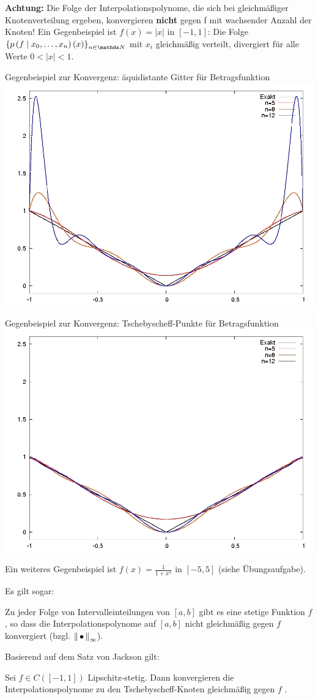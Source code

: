 \textbf{Achtung:} Die Folge der Interpolationspolynome,
die sich bei gleichmäßiger Knotenverteilung ergeben,
konvergieren \textbf{nicht} gegen f mit wachsender Anzahl der Knoten!
Ein Gegenbeispiel ist $f(x)=|x|$ in $[-1,1]$:
Die Folge $\left\{\ipol{p}{f}{x_0,\dotsc,x_n}(x)\right\}_{n\in\N}$
mit $x_i$ gleichmäßig verteilt,
divergiert für alle Werte $0<|x|<1$.

\begin{image}{Gegenbeispiel zur Konvergenz: äquidistante Gitter für Betragsfunktion}
  \includegraphics[width=0.5\linewidth]{images/afg49aequi.jpg}
\end{image}
\label{6.1.20im1}
\begin{image}{Gegenbeispiel zur Konvergenz: Tschebyscheff-Punkte für Betragsfunktion}
  \includegraphics[width=0.5\linewidth]{images/afg49tscheby.jpeg}
\end{image}
\label{6.1.20im2}

Ein weiteres Gegenbeispiel ist $f(x)=\frac{1}{1+x^2}$ in $[-5,5]$ 
(siehe Übungsaufgabe).

Es gilt sogar:

\begin{Satze}[Faber]
  Zu jeder Folge von Intervalleinteilungen von $[a,b]$
  gibt es eine stetige Funktion $f$ ,
  so dass die Interpolationspolynome auf $[a, b]$
  nicht gleichmäßig gegen $f$ konvergiert 
  (bzgl. $\left\| \,\bullet\, \right\|_\infty$).
\end{Satze}

Basierend auf dem Satz von Jackson gilt:
\begin{Satze}
  Sei $f\in C([-1,1])$ Lipschitz-stetig.
  Dann konvergieren die Interpolationspolynome
  zu den Tschebyscheff-Knoten gleichmäßig	gegen $f$ .
\end{Satze}

